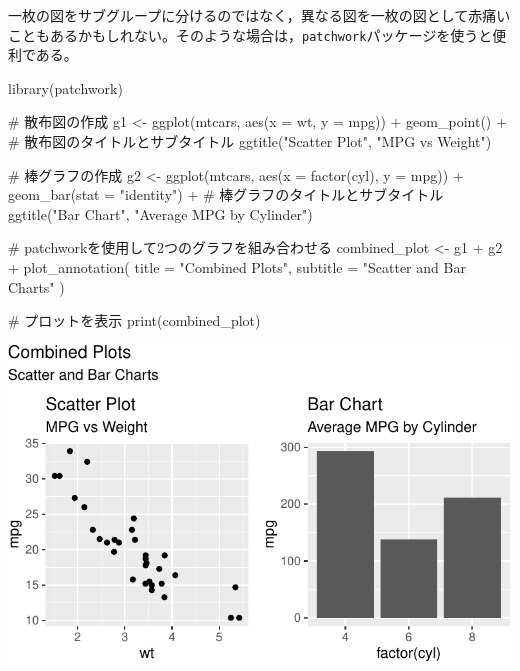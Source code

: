 \documentclass[
  a4paper,
]{ltjsbook}
\newenvironment{Shaded}{\begin{snugshade}}{\end{snugshade}}
\newcommand{\AttributeTok}[1]{\textcolor[rgb]{0.40,0.45,0.13}{#1}}
\newcommand{\CommentTok}[1]{\textcolor[rgb]{0.37,0.37,0.37}{#1}}
\newcommand{\FunctionTok}[1]{\textcolor[rgb]{0.28,0.35,0.67}{#1}}
\newcommand{\NormalTok}[1]{\textcolor[rgb]{0.00,0.23,0.31}{#1}}
\newcommand{\OtherTok}[1]{\textcolor[rgb]{0.00,0.23,0.31}{#1}}
\newcommand{\SpecialCharTok}[1]{\textcolor[rgb]{0.37,0.37,0.37}{#1}}
\newcommand{\StringTok}[1]{\textcolor[rgb]{0.13,0.47,0.30}{#1}}
\begin{document}
一枚の図をサブグループに分けるのではなく，異なる図を一枚の図として赤痛いこともあるかもしれない。そのような場合は，\texttt{patchwork}パッケージを使うと便利である。

\begin{Shaded}
\begin{Highlighting}[]
\FunctionTok{library}\NormalTok{(patchwork)}

\CommentTok{\# 散布図の作成}
\NormalTok{g1 }\OtherTok{\textless{}{-}} \FunctionTok{ggplot}\NormalTok{(mtcars, }\FunctionTok{aes}\NormalTok{(}\AttributeTok{x =}\NormalTok{ wt, }\AttributeTok{y =}\NormalTok{ mpg)) }\SpecialCharTok{+}
  \FunctionTok{geom\_point}\NormalTok{() }\SpecialCharTok{+}
  \CommentTok{\# 散布図のタイトルとサブタイトル}
  \FunctionTok{ggtitle}\NormalTok{(}\StringTok{"Scatter Plot"}\NormalTok{, }\StringTok{"MPG vs Weight"}\NormalTok{)}

\CommentTok{\# 棒グラフの作成}
\NormalTok{g2 }\OtherTok{\textless{}{-}} \FunctionTok{ggplot}\NormalTok{(mtcars, }\FunctionTok{aes}\NormalTok{(}\AttributeTok{x =} \FunctionTok{factor}\NormalTok{(cyl), }\AttributeTok{y =}\NormalTok{ mpg)) }\SpecialCharTok{+}
  \FunctionTok{geom\_bar}\NormalTok{(}\AttributeTok{stat =} \StringTok{"identity"}\NormalTok{) }\SpecialCharTok{+}
  \CommentTok{\# 棒グラフのタイトルとサブタイトル}
  \FunctionTok{ggtitle}\NormalTok{(}\StringTok{"Bar Chart"}\NormalTok{, }\StringTok{"Average MPG by Cylinder"}\NormalTok{)}

\CommentTok{\# patchworkを使用して2つのグラフを組み合わせる}
\NormalTok{combined\_plot }\OtherTok{\textless{}{-}}\NormalTok{ g1 }\SpecialCharTok{+}\NormalTok{ g2 }\SpecialCharTok{+}
  \FunctionTok{plot\_annotation}\NormalTok{(}
    \AttributeTok{title =} \StringTok{"Combined Plots"}\NormalTok{,}
    \AttributeTok{subtitle =} \StringTok{"Scatter and Bar Charts"}
\NormalTok{  )}

\CommentTok{\# プロットを表示}
\FunctionTok{print}\NormalTok{(combined\_plot)}
\end{Highlighting}
\end{Shaded}

\includegraphics{chapter04_files/figure-pdf/patchwork example-1.pdf}
\end{document}
